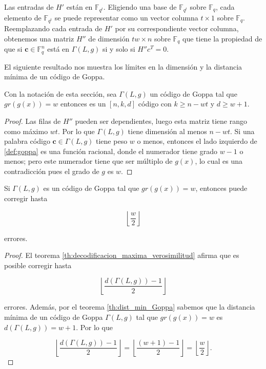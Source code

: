 Las entradas de $H'$ están en $\mathbb{F}_{q^t}$. Eligiendo una base de $\mathbb{F}_{q^t}$ sobre $\mathbb{F}_q$, cada elemento de $\mathbb{F}_{q^t}$ se puede representar como un vector columna $t \times 1$ sobre $\mathbb{F}_q$. Reemplazando cada entrada de $H'$ por su correspondiente vector columna, obtenemos una matriz $H''$ de dimensión $tw \times n$ sobre $\mathbb{F}_{q}$ que tiene la propiedad de que si $\textbf{c} \in \mathbb{F}_q^n$ está en $\Gamma(L,g)$ si y solo si $H''c^T = 0$.

El siguiente resultado nos muestra los límites en la dimensión y la distancia mínima de un código de Goppa.

\begin{theorem}
    \label{th:dist_min_Goppa}
    Con la notación de esta sección, sea $\Gamma(L,g)$ un código de Goppa tal que $gr(g(x)) = w$ entonces es un $[n, k, d]$ código con $k \geq n - wt$ y $d \geq w + 1$.
\end{theorem}

\begin{proof}
    Las filas de $H''$ pueden ser dependientes, luego esta matriz tiene rango como máximo $wt$. Por lo que $\Gamma(L,g)$ tiene dimensión al menos $n - wt$. Si una palabra código $\textbf{c} \in \Gamma(L,g)$ tiene peso $w$ o menos, entonces el lado izquierdo de \ref{def:goppa} es una función racional, donde el numerador tiene grado $w - 1$ o menos; pero este numerador tiene que ser múltiplo de $g(x)$, lo cual es una contradicción pues el grado de $g$ es $w$.
\end{proof}

\begin{corollary}
    Si $\Gamma(L,g)$ es un código de Goppa tal que $gr(g(x)) = w$, entonces puede corregir hasta

    $$\left\lfloor \frac{w}{2} \right\rfloor $$

    errores.
\end{corollary}

\begin{proof}
    El teorema \ref{th:decodificacion_maxima_verosimilitud} afirma que es posible corregir hasta 
    
    $$\left\lfloor \frac{d(\Gamma(L,g)) - 1}{2} \right\rfloor$$

    errores. Además, por el teorema \ref{th:dist_min_Goppa} sabemos que la distancia mínima de un código de Goppa $\Gamma(L,g)$ tal que $gr(g(x)) = w$ es $d(\Gamma(L,g)) = w + 1$. Por lo que

    $$\left\lfloor \frac{d(\Gamma(L,g)) - 1}{2} \right\rfloor = \left\lfloor \frac{(w + 1) - 1}{2} \right\rfloor = \left\lfloor \frac{w}{2} \right\rfloor .$$
\end{proof}

